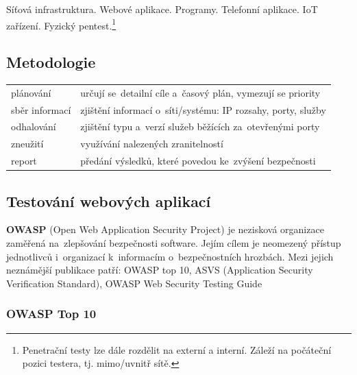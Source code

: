 Síťová infrastruktura. Webové aplikace. Programy. Telefonní aplikace. IoT zařízení. Fyzický pentest.\footnote{Penetrační testy lze dále rozdělit na externí a interní. Záleží na počáteční pozici testera, tj. mimo/uvnitř sítě.} 

\subsection{Metodologie}

\begin{table}[h]
\centering
\begin{tabular}{p{3cm}|p{12cm}}
plánování      & určují se~detailní cíle a~časový plán, vymezují se priority \\
sběr informací & zjištění informací o~síti/systému: IP rozsahy, porty, služby \\
odhalování     & zjištění typu a~verzí služeb běžících za~otevřenými porty \\
zneužití       & využívání nalezených zranitelností \\
report         & předání výsledků, které povedou ke~zvýšení bezpečnosti \\
\end{tabular}
\end{table}

\subsection{Testování webových aplikací}

\textbf{OWASP} (Open Web Application Security Project) je nezisková organizace zaměřená na~zlepšování bezpečnosti software. Jejím cílem je neomezený přístup jednotlivců i~organizací k~informacím o~bezpečnostních hrozbách. Mezi jejich neznámější publikace patří: OWASP top 10, ASVS (Application Security Verification Standard), OWASP Web Security Testing Guide

\subsubsection{OWASP Top 10}

